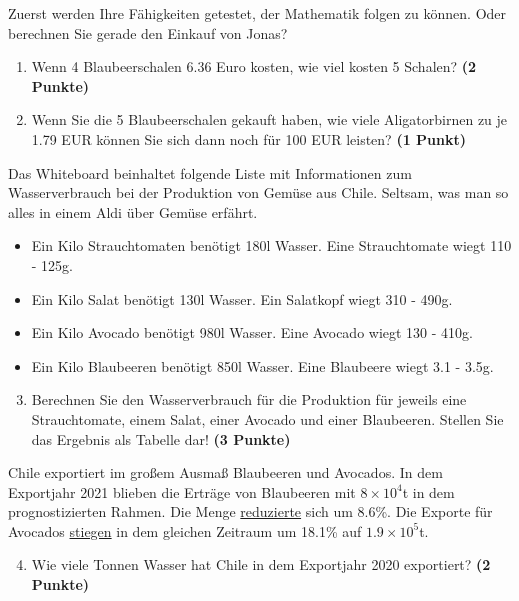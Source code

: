 \documentclass[a4paper, 9pt]{scrartcl}\usepackage[]{graphicx}\usepackage[]{xcolor}
\begin{document}
Zuerst werden Ihre Fähigkeiten getestet, der Mathematik folgen zu können. Oder berechnen Sie gerade den Einkauf von Jonas?\\

\begin{enumerate}
\item Wenn 4 Blaubeerschalen 6.36 Euro kosten,  wie viel kosten 5 Schalen? \textbf{(2 Punkte)}
\item Wenn Sie die 5 Blaubeerschalen gekauft haben, wie viele Aligatorbirnen zu je 1.79 EUR können Sie sich dann noch für 100 EUR leisten? \textbf{(1 Punkt)}
\end{enumerate}

Das Whiteboard beinhaltet folgende Liste mit Informationen zum Wasserverbrauch bei der Produktion von Gemüse aus Chile. Seltsam, was man so alles in einem Aldi über Gemüse erfährt.
  
\begin{itemize}[noitemsep]
\item Ein Kilo Strauchtomaten benötigt 180l Wasser. Eine Strauchtomate wiegt 110 - 125g.
\item Ein Kilo Salat benötigt 130l Wasser. Ein Salatkopf wiegt 310 - 490g.
\item Ein Kilo Avocado benötigt 980l Wasser. Eine Avocado wiegt 130 - 410g.
\item Ein Kilo Blaubeeren benötigt 850l Wasser. Eine Blaubeere wiegt 3.1 - 3.5g.
\end{itemize}

\begin{enumerate}
  \setcounter{enumi}{2}
\item Berechnen Sie den Wasserverbrauch für die Produktion für jeweils eine Strauchtomate, einem Salat, einer Avocado und einer Blaubeeren. Stellen Sie das Ergebnis als Tabelle dar! \textbf{(3 Punkte)}
\end{enumerate}

Chile exportiert im großem Ausmaß Blaubeeren und Avocados. In dem Exportjahr 2021 blieben die Erträge von Blaubeeren mit \ensuremath{8\times 10^{4}}t in dem prognostizierten Rahmen. Die Menge \underline{reduzierte} sich um 8.6\%. Die Exporte für Avocados \underline{stiegen} in dem gleichen Zeitraum um 18.1\% auf \ensuremath{1.9\times 10^{5}}t.

\begin{enumerate}
  \setcounter{enumi}{3}
\item Wie viele Tonnen Wasser hat Chile in dem Exportjahr 2020 exportiert? \textbf{(2 Punkte)}
\end{enumerate}
\end{document}
